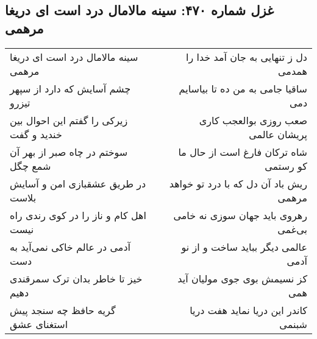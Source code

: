 \begin{center}
\section*{غزل شماره ۴۷۰: سینه مالامال درد است ای دریغا مرهمی}
\label{sec:sh470}
\begin{longtable}{l p{0.5cm} r}
سینه مالامال درد است ای دریغا مرهمی
&&
دل ز تنهایی به جان آمد خدا را همدمی
\\
چشم آسایش که دارد از سپهر تیزرو
&&
ساقیا جامی به من ده تا بیاسایم دمی
\\
زیرکی را گفتم این احوال بین خندید و گفت
&&
صعب روزی بوالعجب کاری پریشان عالمی
\\
سوختم در چاه صبر از بهر آن شمع چگل
&&
شاه ترکان فارغ است از حال ما کو رستمی
\\
در طریق عشقبازی امن و آسایش بلاست
&&
ریش باد آن دل که با درد تو خواهد مرهمی
\\
اهل کام و ناز را در کوی رندی راه نیست
&&
رهروی باید جهان سوزی نه خامی بی‌غمی
\\
آدمی در عالم خاکی نمی‌آید به دست
&&
عالمی دیگر بباید ساخت و از نو آدمی
\\
خیز تا خاطر بدان ترک سمرقندی دهیم
&&
کز نسیمش بوی جوی مولیان آید همی
\\
گریه حافظ چه سنجد پیش استغنای عشق
&&
کاندر این دریا نماید هفت دریا شبنمی
\\
\end{longtable}
\end{center}
